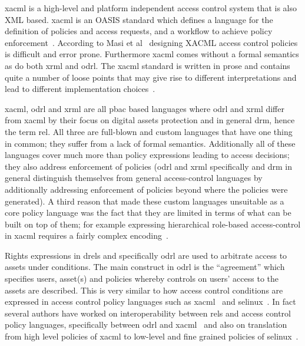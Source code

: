 \documentclass[runningheads,a4paper]{llncs}
\begin{document}
\ac{xacml} is a high-level and platform independent access control system that is also XML based. \ac{xacml} is an OASIS standard which defines a language for the definition of policies and access requests, and a workflow to achieve policy enforcement~\cite{DBLP:conf/essos/MasiPT12}. According to Masi et al~\cite{DBLP:conf/essos/MasiPT12} designing XACML access control policies is difficult and error prone. Furthermore \ac{xacml} comes without a formal semantics as do both \ac{xrml} and \ac{odrl}. The \ac{xacml} standard is written in prose and contains quite a number of loose points that may give rise to different interpretations and lead to different implementation choices~\cite{DBLP:conf/essos/MasiPT12}.

\ac{xacml}, \ac{odrl} and \ac{xrml} are all \ac{pbac} based languages where \ac{odrl} and \ac{xrml} differ from \ac{xacml} by their focus on digital assets protection and in general \ac{drm}, hence the term \ac{rel}. All three are full-blown and custom languages that have one thing in common; they suffer from a lack of formal semantics. Additionally all of these languages cover much more than policy expressions leading to access decisions; they also address enforcement of policies (\ac{odrl} and \ac{xrml} specifically and \ac{drm} in general distinguish themselves from general access-control languages by additionally addressing enforcement of policies beyond where the policies were generated). A third reason that made these custom languages unsuitable as a core policy language was the fact that they are limited in terms of what can be built on top of them; for example expressing hierarchical role-based access-control  in \ac{xacml} requires a fairly complex encoding~\cite{Tschantz}.

Rights expressions in \ac{drel}s and specifically \ac{odrl} are used to arbitrate access to assets under conditions. The main construct in \ac{odrl} is the ``agreement'' which specifies users, asset(s) and policies whereby controls on users' access to the assets are described. This is very similar to how access control conditions are expressed in access control policy languages such as \ac{xacml}~\cite{xacml} and \ac{selinux}~\cite{selinux}. In fact several authors have worked on interoperability between \ac{rel}s and access control policy languages, specifically between \ac{odrl} and \ac{xacml}~\cite{prados2005interoperability,maronas2009architecture} and also on translation from high level policies of \ac{xacml} to low-level and fine grained policies of \ac{selinux}~\cite{alam2008usage}. 
\end{document}
